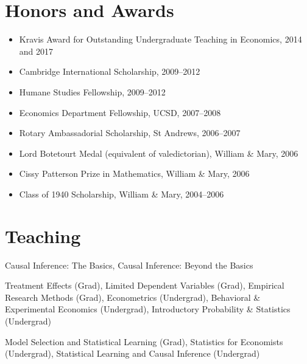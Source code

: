 \documentclass[line,overlapped]{myres}
\begin{document}
\begin{resume}
\section{\sc Honors and Awards}
\vspace{1em}
\begin{itemize}
\item Kravis Award for Outstanding Undergraduate Teaching in Economics, 2014 and 2017
\item Cambridge International Scholarship, 2009--2012
\item Humane Studies Fellowship, 2009--2012
\item Economics Department Fellowship, UCSD, 2007--2008
\item Rotary Ambassadorial Scholarship, St Andrews, 2006--2007
\item Lord Botetourt Medal (equivalent of valedictorian), William \& Mary, 2006
\item Cissy Patterson Prize in Mathematics, William \& Mary, 2006
\item Class of 1940 Scholarship, William \& Mary, 2004--2006
\end{itemize}

\section{\sc Teaching }
\begin{description}[style=multiline,leftmargin=3cm,font=\normalfont]
  \item[Short Courses:] Causal Inference: The Basics, Causal Inference: Beyond the Basics
  \item[Oxford:] Treatment Effects (Grad), Limited Dependent Variables (Grad), Empirical Research Methods (Grad), Econometrics (Undergrad), Behavioral \& Experimental Economics (Undergrad), Introductory Probability \& Statistics (Undergrad)
  \item[UPenn:] Model Selection and Statistical Learning (Grad), Statistics for Economists (Undergrad), Statistical Learning and Causal Inference (Undergrad)
\end{description}



\end{resume}
\end{document}
